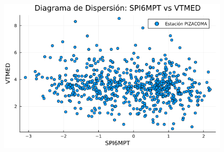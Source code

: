 \begin{figure}[htbp]
\begin{minipage}{0.32\textwidth}
    \includegraphics[width=\linewidth]{Capitulos/Scaterplot/PIZACOMA_SPI6MPT_vs_VTMED.png}
\end{minipage}

\vspace{0.5cm}  %


\end{figure}
